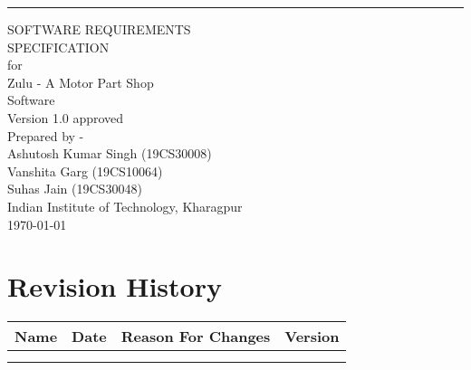 \documentclass{scrreprt}
\date{}
\def\myversion{1.0 }
\begin{document}

\begin{flushright}
    \rule{16cm}{5pt}\vskip1cm
    \begin{bfseries}
        \Huge{SOFTWARE REQUIREMENTS\\ SPECIFICATION}\\
        \vspace*{0.8cm}
        \huge{for}\\
        \vspace*{0.8cm}
        \Huge{Zulu - A Motor Part Shop\\ Software}\\
        \vspace*{1.5cm}
        \LARGE{Version \myversion approved}\\
        \vspace*{1.5cm}
        Prepared by -\\
        \vspace*{0.5cm}
        Ashutosh Kumar Singh (19CS30008)\\
        \vspace*{0.5cm}
        Vanshita Garg (19CS10064)\\
        \vspace*{0.5cm}
        Suhas Jain (19CS30048)\\
        \vspace*{1.5cm}
        Indian Institute of Technology, Kharagpur\\
        \vspace*{1.5cm}
        \today\\
    \end{bfseries}
\end{flushright}

\tableofcontents

\section*{Revision History}

\begin{center}
    \begin{tabular}{|c|c|c|c|}
        \hline
	    Name & Date & Reason For Changes & Version\\
        \hline
	     &  & & \\
        \hline
	     &  & & \\
        \hline
    \end{tabular}
\end{center}
\end{document}
